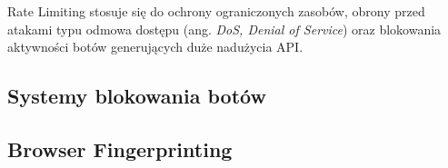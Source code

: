 Rate Limiting stosuje się do ochrony ograniczonych zasobów, obrony przed atakami typu odmowa dostępu (ang. \emph{DoS, Denial of Service})
oraz blokowania aktywności botów generujących duże nadużycia API\@.

\newpage
\subsection{Systemy blokowania botów}\label{subsec:waf}


\subsection{Browser Fingerprinting}\label{subsec:browser-fingerprinting}

